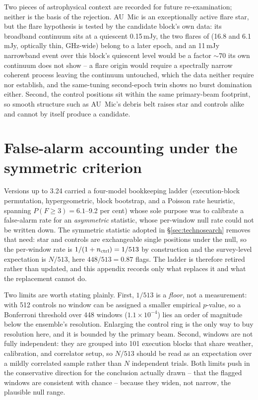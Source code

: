 \documentclass{openjournal}
\begin{document}
Two pieces of astrophysical context are recorded for future
re-examination; neither is the basis of the rejection. AU~Mic is an
exceptionally active flare star, but the flare hypothesis is tested
by the candidate block's own data: its broadband continuum sits at a
quiescent 0.15\,mJy, the two flares of \citet{MacGregor2020} (16.8
and 6.1\,mJy, optically thin, GHz-wide) belong to a later epoch, and
an 11\,mJy narrowband event over this block's quiescent level would
be a factor ${\sim}70$ its own continuum does not show -- a flare
origin would require a spectrally narrow coherent process leaving the
continuum untouched, which the data neither require nor establish,
and the same-tuning second-epoch twin shows no burst domination
either. Second, the control positions sit within the same
primary-beam footprint, so smooth structure such as AU~Mic's debris
belt raises star and controls alike and cannot by itself produce a
candidate.

\section{False-alarm accounting under the symmetric criterion}
\label{app:falsealarm}

Versions up to 3.24 carried a four-model bookkeeping ladder
(execution-block permutation, hypergeometric, block bootstrap, and a
Poisson rate heuristic, spanning $P(F{\geq}3)=6.1$--9.2 per cent) whose
sole purpose was to calibrate a false-alarm rate for an
\emph{asymmetric} statistic, whose per-window null rate could not be
written down. The symmetric statistic adopted in \S\ref{sec:technosearch}
removes that need: star and controls are exchangeable single positions
under the null, so the per-window rate is $1/(1+n_{\rm ctrl})=1/513$ by
construction and the survey-level expectation is $N/513$, here
$448/513=0.87$ flags. The ladder is therefore retired rather than
updated, and this appendix records only what replaces it and what the
replacement cannot do.

Two limits are worth stating plainly. First, $1/513$ is a
\emph{floor}, not a measurement: with 512 controls no window can be
assigned a smaller empirical $p$-value, so a Bonferroni threshold over
448 windows ($1.1\times10^{-4}$) lies an order of magnitude below the
ensemble's resolution. Enlarging the control ring is the only way to
buy resolution here, and it is bounded by the primary beam. Second,
windows are not fully independent: they are grouped into 101 execution
blocks that share weather, calibration, and correlator setup, so
$N/513$ should be read as an expectation over a mildly correlated
sample rather than $N$ independent trials. Both limits push in the
conservative direction for the conclusion actually drawn -- that the
flagged windows are consistent with chance -- because they widen, not
narrow, the plausible null range.
\end{document}

